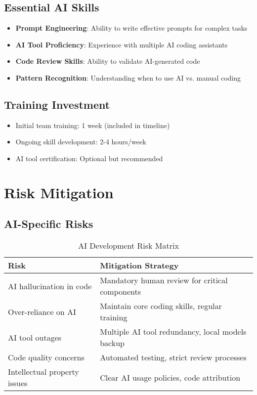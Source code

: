 \documentclass[12pt,a4paper]{report}
\begin{document}
\subsection{Essential AI Skills}
\begin{itemize}
    \item \textbf{Prompt Engineering}: Ability to write effective prompts for complex tasks
    \item \textbf{AI Tool Proficiency}: Experience with multiple AI coding assistants
    \item \textbf{Code Review Skills}: Ability to validate AI-generated code
    \item \textbf{Pattern Recognition}: Understanding when to use AI vs. manual coding
\end{itemize}

\subsection{Training Investment}
\begin{itemize}
    \item Initial team training: 1 week (included in timeline)
    \item Ongoing skill development: 2-4 hours/week
    \item AI tool certification: Optional but recommended
\end{itemize}

\section{Risk Mitigation}

\subsection{AI-Specific Risks}
\begin{table}[H]
\centering
\begin{tabularx}{\textwidth}{|X|X|}
\hline
\textbf{Risk} & \textbf{Mitigation Strategy} \\
\hline
AI hallucination in code & Mandatory human review for critical components \\
Over-reliance on AI & Maintain core coding skills, regular training \\
AI tool outages & Multiple AI tool redundancy, local models backup \\
Code quality concerns & Automated testing, strict review processes \\
Intellectual property issues & Clear AI usage policies, code attribution \\
\hline
\end{tabularx}
\caption{AI Development Risk Matrix}
\end{table}
\end{document}

